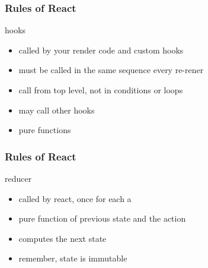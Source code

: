 \begin{frame}[fragile] \frametitle{Rules of React}
hooks
\begin{itemize}
  \item called by your render code and custom hooks
  \item must be called in the same sequence every re-rener
  \item call from top level, not in conditions or loops
  \item may call other hooks
  \item pure functions
\end{itemize}
\end{frame}
\begin{frame}[fragile] \frametitle{Rules of React}
reducer
\begin{itemize}
  \item called by react, once for each a 
  \item pure function of previous state and the action
  \item computes the next state
  \item remember, state is immutable
\end{itemize}
\end{frame}

